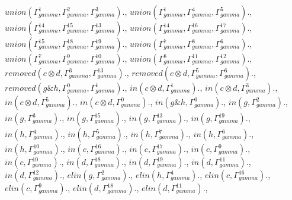 \documentclass[a4paper, 11pt]{article}
\begin{document}
$union(\Gamma_{gamma}^{1}, \Gamma_{gamma}^{2}, \Gamma_{gamma}^{3}).$, $union(\Gamma_{gamma}^{1}, \Gamma_{gamma}^{4}, \Gamma_{gamma}^{5}).$, $union(\Gamma_{gamma}^{14}, \Gamma_{gamma}^{15}, \Gamma_{gamma}^{13}).$, $union(\Gamma_{gamma}^{14}, \Gamma_{gamma}^{16}, \Gamma_{gamma}^{17}).$, $union(\Gamma_{gamma}^{15}, \Gamma_{gamma}^{18}, \Gamma_{gamma}^{19}).$, $union(\Gamma_{gamma}^{7}, \Gamma_{gamma}^{8}, \Gamma_{gamma}^{6}).$, $union(\Gamma_{gamma}^{7}, \Gamma_{gamma}^{9}, \Gamma_{gamma}^{10}).$, $union(\Gamma_{gamma}^{8}, \Gamma_{gamma}^{11}, \Gamma_{gamma}^{12}).$, $removed(c \otimes d, \Gamma_{gamma}^{3}, \Gamma_{gamma}^{13}).$, $removed(c \otimes d, \Gamma_{gamma}^{5}, \Gamma_{gamma}^{6}).$, $removed(g \binampersand h, \Gamma_{gamma}^{0}, \Gamma_{gamma}^{1}).$, $in(c \otimes d, \Gamma_{gamma}^{1}).$, $in(c \otimes d, \Gamma_{gamma}^{3}).$, $in(c \otimes d, \Gamma_{gamma}^{5}).$, $in(c \otimes d, \Gamma_{gamma}^{0}).$, $in(g \binampersand h, \Gamma_{gamma}^{0}).$, $in(g, \Gamma_{gamma}^{2}).$, $in(g, \Gamma_{gamma}^{3}).$, $in(g, \Gamma_{gamma}^{15}).$, $in(g, \Gamma_{gamma}^{13}).$, $in(g, \Gamma_{gamma}^{19}).$, $in(h, \Gamma_{gamma}^{4}).$, $in(h, \Gamma_{gamma}^{5}).$, $in(h, \Gamma_{gamma}^{7}).$, $in(h, \Gamma_{gamma}^{6}).$, $in(h, \Gamma_{gamma}^{10}).$, $in(c, \Gamma_{gamma}^{16}).$, $in(c, \Gamma_{gamma}^{17}).$, $in(c, \Gamma_{gamma}^{9}).$, $in(c, \Gamma_{gamma}^{10}).$, $in(d, \Gamma_{gamma}^{18}).$, $in(d, \Gamma_{gamma}^{19}).$, $in(d, \Gamma_{gamma}^{11}).$, $in(d, \Gamma_{gamma}^{12}).$, $elin(g, \Gamma_{gamma}^{2}).$, $elin(h, \Gamma_{gamma}^{4}).$, $elin(c, \Gamma_{gamma}^{16}).$, $elin(c, \Gamma_{gamma}^{9}).$, $elin(d, \Gamma_{gamma}^{18}).$, $elin(d, \Gamma_{gamma}^{11}).$, 
\end{document}
